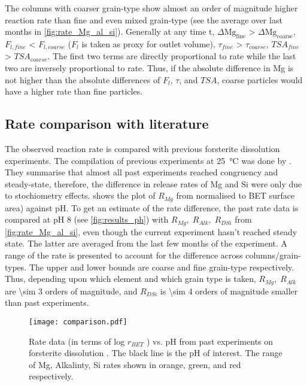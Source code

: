 \noindent The columns with coarser grain-type show almost an order of magnitude higher reaction rate than fine and even mixed grain-type (see the average over last months in \cref{fig:rate_Mg_al_si}). Generally at any time t, $\Delta\mathrm{Mg_{fine}}$ > $\Delta\mathrm{Mg_{coarse}}$, $F_{l,fine}$ < $F_{l,coarse}$ ($F_l$ is taken as proxy for outlet volume), $\tau_{fine}$ > $\tau_{coarse}$, $TSA_{fine}$ > $TSA_{coarse}$. The first two terms are directly proportional to rate while the last two are inversely proportional to rate. Thus, if the absolute difference in Mg is not higher than the absolute differences of $F_l$, $\tau$, and $TSA$, coarse particles would have a higher rate than fine particles. 

\subsection{Rate comparison with literature}
 
The observed reaction rate is compared with previous forsterite dissolution experiments. The compilation of previous experiments at \SI{25}{\degreeCelsius} was done by \cite{rimstidt2012}. They summarise that almost all past experiments reached congruency and steady-state, therefore, the difference in release rates of Mg and Si were only due to stochiometry effects.  shows the plot of $R_{Mg}$ from \cite{rimstidt2012} normalised to BET surface area) against pH. To get an estimate of the rate difference, the past rate data is compared at pH 8 (see \cref{fig:results_ph}) with $R_{Mg},\; R_{Alk},\; R_{DSi}$ from \cref{fig:rate_Mg_al_si}, even though the current experiment hasn't reached steady state. The latter are averaged from the last few months of the experiment. A range of the rate is presented to account for the difference across columns/grain-types. The upper and lower bounds are coarse and fine grain-type respectively. Thus, depending upon which element and which grain type is taken, $R_{Mg},\;R_{Alk}$  are \num{\sim 3} orders of magnitude, and $R_{DSi}$ is \num{\sim 4} orders of magnitude smaller than past experiments.\\
 
\begin{figure}[h]
\centering
\texttt{[image: comparison.pdf]}
\caption{Rate data (in terms of log $r_{BET}$ ) vs. pH from past experiments on forsterite dissolution \citep{rimstidt2012}. The black line is the pH of interest. The range of  Mg, Alkalinty, Si rates shown in orange, green, and red respectively.}
\label{fig:comparison}
\end{figure}

